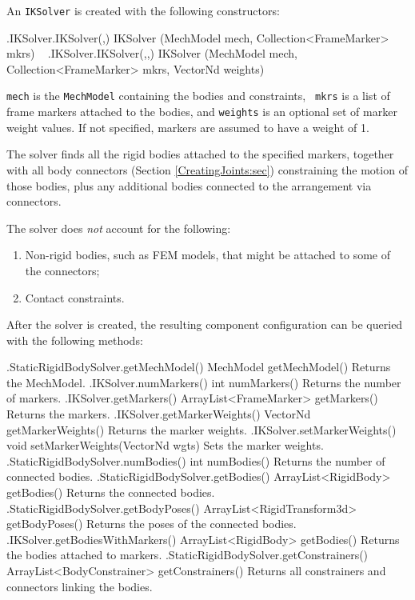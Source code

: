 An {\tt IKSolver} is created with the following constructors:
%
\begin{methodtable}{0.8}{0.2}
%
\methodentry
{\probes.IKSolver.IKSolver(,)}%
{IKSolver (MechModel mech, Collection<FrameMarker> mkrs)}%
{\ }%
%
\methodentry
{\probes.IKSolver.IKSolver(,,)}%
{IKSolver (MechModel mech, Collection<FrameMarker> mkrs, VectorNd weights)}%
{\ }%
%
\end{methodtable}
%
{\tt mech} is the {\tt MechModel} containing the bodies and constraints, {\tt
mkrs} is a list of frame markers attached to the bodies, and {\tt weights} is
an optional set of marker weight values. If not specified, markers are assumed
to have a weight of 1.

The solver finds all the rigid bodies attached to the specified markers,
together with all body connectors (Section \ref{CreatingJoints:sec})
constraining the motion of those bodies, plus any additional bodies connected
to the arrangement via connectors. 

\begin{sideblock}
The solver does {\it not} account for the following:
\begin{enumerate}

\item Non-rigid bodies, such as FEM models, that might be attached
to some of the connectors;

\item Contact constraints.

\end{enumerate}
\end{sideblock}

After the solver is created, the resulting component configuration can be
queried with the following methods:
%
\begin{methodtable}{0.45}{0.55}
\midline
%
\methodentry
{\mech.StaticRigidBodySolver.getMechModel()}%
{MechModel getMechModel()}%
{Returns the MechModel.}%
%
\methodentry
{\probes.IKSolver.numMarkers()}%
{int numMarkers()}%
{Returns the number of markers.}%
%
\methodentry
{\probes.IKSolver.getMarkers()}%
{ArrayList<FrameMarker> getMarkers()}%
{Returns the markers.}%
%
\methodentry
{\probes.IKSolver.getMarkerWeights()}%
{VectorNd getMarkerWeights()}%
{Returns the marker weights.}%
%
\methodentry
{\probes.IKSolver.setMarkerWeights()}%
{void setMarkerWeights(VectorNd wgts)}%
{Sets the marker weights.}%
%
\methodspace{0.5em}%
\methodentry
{\mech.StaticRigidBodySolver.numBodies()}%
{int numBodies()}%
{Returns the number of connected bodies.}%
%
\methodentry
{\mech.StaticRigidBodySolver.getBodies()}%
{ArrayList<RigidBody> getBodies()}%
{Returns the connected bodies.}%
%
\methodentry
{\mech.StaticRigidBodySolver.getBodyPoses()}%
{ArrayList<RigidTransform3d> getBodyPoses()}%
{Returns the poses of the connected bodies.}%
%
\methodentry
{\probes.IKSolver.getBodiesWithMarkers()}%
{ArrayList<RigidBody> getBodies()}%
{Returns the bodies attached to markers.}%
%
\methodspace{0.5em}%
\methodentry
{\mech.StaticRigidBodySolver.getConstrainers()}%
{ArrayList<BodyConstrainer> getConstrainers()}%
{Returns all constrainers and connectors linking the bodies.}%
%
\midline
\end{methodtable}
%

